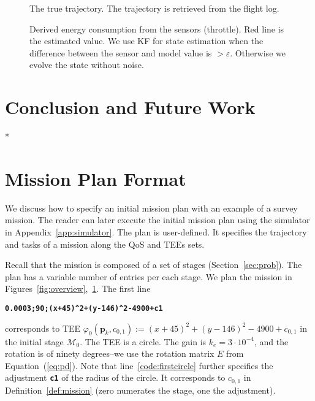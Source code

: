 \documentclass[letterpaper,10pt,conference]{ieeeconf}
\newcommand{\figpath}{./figures}
\theoremstyle{definition}
\begin{document}
\begin{figure}[h]
  \centering
  
  \caption{The true trajectory. The trajectory is retrieved from the flight log.}
  \label{fig:trajectory}
\end{figure}

\begin{figure}[h]
  \centering
  
  \caption{Derived energy consumption from the sensors (throttle). Red line is the estimated value. We use KF for state estimation when the difference between the sensor and model value is $>\varepsilon$. Otherwise we evolve the state without noise.}
  \label{fig:energy-max}
\end{figure}


\section{Conclusion and Future Work}
\label{sec:conclusion}

*

\leavevmode\thispagestyle{empty}\newpage %


 

\leavevmode\thispagestyle{empty}\newpage

\appendices
\section{Mission Plan Format}

We discuss how to specify an initial mission plan with an example of a survey mission. The reader can later execute the initial mission plan using the simulator in Appendix~\ref{app:simulator}. The plan is user-defined. It specifies the trajectory and tasks of a mission along the QoS and TEEs sets. 

Recall that the mission is composed of a set of stages (Section~\ref{sec:prob}). The plan has a variable number of entries per each stage. We plan the mission in Figures~\ref{fig:overview},~\ref{fig:trajectory}. The first line
\begin{algorithmic}[1]
  \State\textbf{\texttt{0.0003;90;(x+45)\^{}2+(y-146)\^{}2-4900+c1}}\label{code:firstcircle}
\end{algorithmic}
corresponds to TEE $\varphi_0(\mathbf{p}_k,c_{0,1}):=(x+45)^2+(y-146)^2-4900+c_{0,1}$ in the initial stage $\mathcal{M}_0$. The TEE is a circle. The gain is $k_e=3\cdot 10^{-4}$, and the rotation is of ninety degrees--we use the rotation matrix $E$ from Equation~(\ref{eq:pd}). Note that line~\ref{code:firstcircle} further specifies the adjustment {\tt\textbf{c1}} of the radius of the circle. It corresponds to $c_{0,1}$ in Definition~\ref{def:mission} (zero numerates the stage, one the adjustment).
\end{document}
